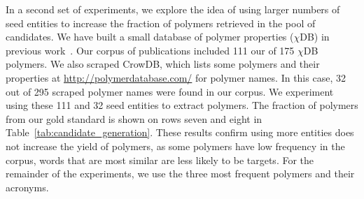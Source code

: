 In a second set of experiments, we explore the idea of using larger numbers of seed entities to increase the fraction of polymers retrieved in the pool of candidates.
We have built a small database of polymer properties ($\chi$DB) in previous work~\cite{tchoua2016hybrid,tchoua2016hybridi}. 
Our corpus of  publications included 111 our of 175 $\chi$DB polymers.  
We also scraped CrowDB, which lists some polymers and their properties at \url{http://polymerdatabase.com/} for polymer names.
In this case, 32 out of 295 scraped polymer names were found in our corpus.
We experiment using these 111 and 32 seed entities to extract polymers. The fraction of polymers from our gold standard is shown on rows seven and eight in Table~\ref{tab:candidate_generation}.
These results confirm using more entities does not increase the yield of polymers, as some polymers have low frequency in the corpus, words that are most similar are less likely to be targets.
For the remainder of the experiments, we use the three most frequent polymers and their acronyms. 


